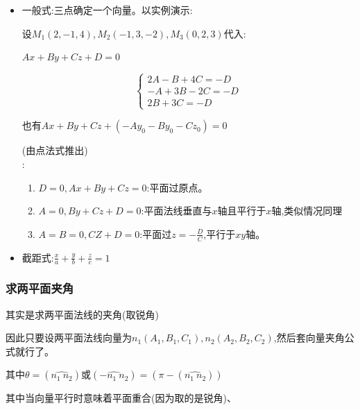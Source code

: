 \documentclass[UTF8]{ctexbook}
\begin{document}
{{{{\begin{itemize}
{              设一点$M_0:(x_0,y_0,z_0)$,法线向量:$\vec{n} = (A,B,C)$

              设$M(x,y,z),\vec{M_0M}=(x - x_0,y - y_0,z - z_0),\vec{n} \cdot \vec{M_0M} = 0$

              平面的点法式方程为:$A(x - x_0) + B(y - y_0) + C(z - z_0) = 0$
              }
        \item {
              一般式:三点确定一个向量。以实例演示:

              设$M_1(2,-1,4),M_2(-1,3,-2),M_3(0,2,3)$代入:

              $Ax + By + Cz + D = 0$

              $$
                \begin{cases}
                  2A - B + 4C = -D \\
                  -A + 3B -2C = -D \\
                  2B + 3C = -D
                \end{cases}
              $$

              也有$Ax + By + Cz + (-Ay_0 - By_0 - Cz_0) = 0$

              (由点法式推出)\\

              :
              \begin{enumerate}
                \item $D = 0,Ax + By + Cz = 0$:平面过原点。
                \item $A = 0,By + Cz + D = 0$:平面法线垂直与$x$轴且平行于$x$轴,类似情况同理
                \item $A = B = 0,CZ + D = 0$:平面过$z = -\frac{D}{C}$,平行于$xy$轴。
              \end{enumerate}
              }
        \item 截距式:$\frac{x}{a} + \frac{y}{b} + \frac{z}{c} = 1$
      \end{itemize}
    }%

    \subsubsection{求两平面夹角}{
      其实是求两平面法线的夹角(取锐角)

      因此只要设两平面法线向量为$n_1(A_1,B_1,C_1),n_2(A_2,B_2,C_2)$,然后套向量夹角公式就行了。

      其中$\theta = (\hat{n_1\ n_2})$或$(\hat{-n_1\ n_2}) = (\pi - (\hat{n_1\ n_2}))$

      其中当向量平行时意味着平面重合(因为取的是锐角)、
    }%

}}}
\end{document}

